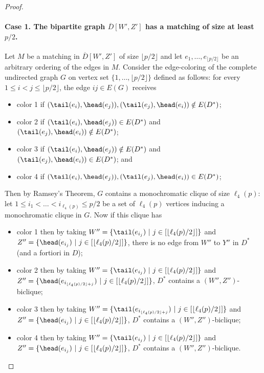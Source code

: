 \begin{proof}
\begin{claimproof}
\paragraph{Case 1. The bipartite graph $\overline{D}[W',Z']$ has a matching of size at least $p/2$.} Let $M$ be a matching in $\overline{D}[W',Z']$ of size $\lfloor p/2 \rfloor$ and let $e_1,\ldots,e_{\lfloor p/2 \rfloor}$ be an arbitrary ordering of the edges in $M$. Consider the edge-coloring of the complete undirected graph $G$ on vertex set $\{1,\ldots, \lfloor p/2 \rfloor\}$ defined as follows: for every $1 \leq i < j \leq \lfloor p/2 \rfloor$, the edge $ij \in E(G)$ receives
\begin{itemize}
\item color 1 if $(\tail(e_i),\head(e_j)),(\tail(e_j),\head(e_i)) \notin E(D^*)$;
\item color 2 if $(\tail(e_i),\head(e_j)) \in E(D^*)$ and $(\tail(e_j),\head(e_i)) \notin E(D^*)$;
\item color 3 if $(\tail(e_i),\head(e_j)) \notin E(D^*)$ and $(\tail(e_j),\head(e_i)) \in E(D^*)$; and
\item color 4 if $(\tail(e_i),\head(e_j)),(\tail(e_j),\head(e_i)) \in E(D^*)$;
\end{itemize}
Then by Ramsey's Theorem, $G$ contains a monochromatic clique of size $\ell_4(p)$: let $1 \leq i_1 < \ldots < i_{\ell_4(p)} \leq p/2$ be a set of $\ell_4(p)$ vertices inducing a monochromatic clique in $G$. Now if this clique has
\begin{itemize}
\item color 1 then by taking $W'' = \{\tail(e_{i_j})~|~j \in [\lfloor \ell_4(p)/2 \rfloor]\}$ and $Z'' = \{\head(e_{i_j})~|~j \in [\lfloor \ell_4(p)/2 \rfloor]\}$, there is no edge from $W''$ to $Y''$ in $D^*$ (and a fortiori in $D$);
\item color 2 then by taking $W'' = \{\tail(e_{i_j})~|~j \in [\lfloor \ell_4(p)/2 \rfloor]\}$ and $Z'' = \{\head(e_{i_{\lfloor \ell_4(p)/2 \rfloor + j}})~|~j \in [\lfloor \ell_4(p)/2 \rfloor]\}$, $D^*$ contains a $(W'',Z'')$-biclique;
\item color 3 then by taking $W'' = \{\tail(e_{i_{\lfloor \ell_4(p)/2 \rfloor + j}})~|~j \in [\lfloor \ell_4(p)/2 \rfloor]\}$ and $Z'' = \{\head(e_{i_j})~|~j \in [\lfloor \ell_4(p)/2 \rfloor]\}$, $D^*$ contains a $(W'',Z'')$-biclique;
\item color 4 then by taking $W'' = \{\tail(e_{i_j})~|~j \in [\lfloor \ell_4(p)/2 \rfloor]\}$ and $Z'' = \{\head(e_{i_j})~|~j \in [\lfloor \ell_4(p)/2 \rfloor]\}$, $D^*$ contains a $(W'',Z'')$-biclique.
\end{itemize}


\end{claimproof}
\end{proof}
